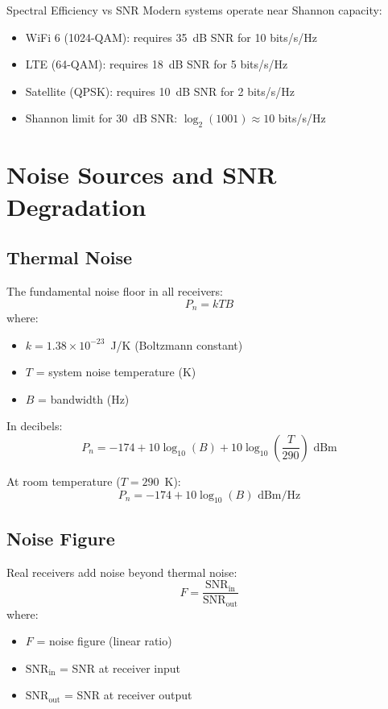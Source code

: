 \begin{calloutbox}{Spectral Efficiency vs SNR}
Modern systems operate near Shannon capacity:
\begin{itemize}
\item WiFi 6 (1024-QAM): requires 35~dB SNR for 10 bits/s/Hz
\item LTE (64-QAM): requires 18~dB SNR for 5 bits/s/Hz
\item Satellite (QPSK): requires 10~dB SNR for 2 bits/s/Hz
\item Shannon limit for 30~dB SNR: $\log_2(1001) \approx 10$ bits/s/Hz
\end{itemize}
\end{calloutbox}

\section{Noise Sources and SNR Degradation}

\subsection{Thermal Noise}

The fundamental noise floor in all receivers:
\begin{equation}
P_n = kTB
\end{equation}
where:
\begin{itemize}
\item $k = 1.38 \times 10^{-23}$~J/K (Boltzmann constant)
\item $T$ = system noise temperature (K)
\item $B$ = bandwidth (Hz)
\end{itemize}

In decibels:
\begin{equation}
P_n = -174 + 10\log_{10}(B) + 10\log_{10}\left(\frac{T}{290}\right) \text{ dBm}
\end{equation}

At room temperature ($T = 290$~K):
\begin{equation}
P_n = -174 + 10\log_{10}(B) \text{ dBm/Hz}
\end{equation}

\subsection{Noise Figure}

Real receivers add noise beyond thermal noise:
\begin{equation}
F = \frac{\mathrm{SNR_{in}}}{\mathrm{SNR_{out}}}
\end{equation}
where:
\begin{itemize}
\item $F$ = noise figure (linear ratio)
\item $\mathrm{SNR_{in}}$ = SNR at receiver input
\item $\mathrm{SNR_{out}}$ = SNR at receiver output
\end{itemize}


